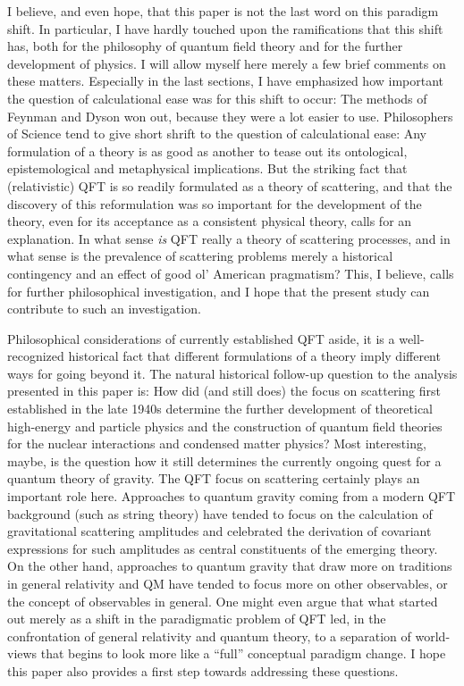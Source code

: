 \documentclass[12pt,a4paper]{article}
\begin{document}
I believe, and even hope, that this paper is not the last word on this paradigm shift. In particular, I have hardly touched upon the ramifications that this shift has, both for the philosophy of quantum field theory and for the further development of physics. I will allow myself here merely a few brief comments on these matters. Especially in the last sections, I have emphasized how important the question of calculational ease was for this shift to occur: The methods of Feynman and Dyson won out, because they were a lot easier to use. Philosophers of Science tend to give short shrift to the question of calculational ease: Any formulation of a theory is as good as another to tease out its ontological, epistemological and metaphysical implications. But the striking fact that (relativistic) QFT is so readily formulated as a theory of scattering, and that the discovery of this reformulation was so important for the development of the theory, even for its acceptance as a consistent physical theory, calls for an explanation. In what sense \emph{is} QFT really a theory of scattering processes, and in what sense is the prevalence of scattering problems merely a historical contingency and an effect of good ol' American pragmatism? This, I believe, calls for further philosophical investigation, and I hope that the present study can contribute to such an investigation.

Philosophical considerations of currently established QFT aside, it is a well-recognized historical fact that different formulations of a theory imply different  ways for going beyond it. The natural historical follow-up question to the analysis presented in this paper is: How did (and still does) the focus on scattering first established in the late 1940s determine the further development of theoretical high-energy and particle physics and the construction of quantum field theories for the nuclear interactions and condensed matter physics? Most interesting, maybe, is the question how it still determines the currently ongoing quest for a quantum theory of gravity. The QFT focus on scattering certainly plays an important role here. Approaches to quantum gravity coming from a modern QFT background (such as string theory) have tended to focus on the calculation of gravitational scattering amplitudes  and celebrated the derivation of covariant expressions for such amplitudes as central constituents of the emerging theory. On the other hand, approaches to quantum gravity that draw more on traditions in general relativity and QM have tended to focus more on other observables, or the concept of observables in general. One might even argue that what started out merely as a shift in the paradigmatic problem of QFT led, in the confrontation of general relativity and quantum theory, to a separation of world-views that begins to look more like a ``full'' conceptual paradigm change. I hope this paper also provides a first step towards addressing these questions.
\end{document}
